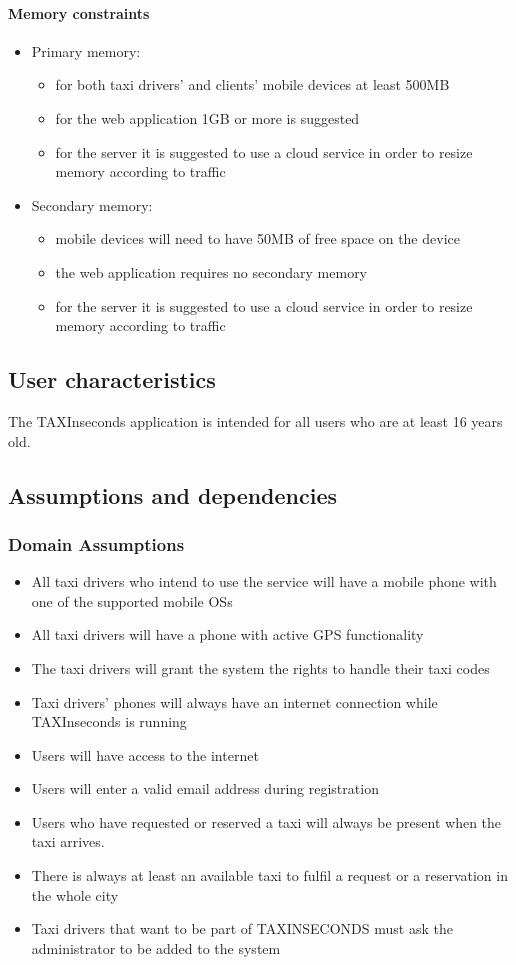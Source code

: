 \documentclass{article}
\begin{document}
\paragraph{Memory constraints} 
\begin{itemize}
	\item Primary memory:
		\begin{itemize}
			\item for both taxi drivers' and clients' mobile devices at least 500MB 
			\item for the web application 1GB or more is suggested
			\item for the server it is suggested to use a cloud service in order to resize memory according to traffic
		\end{itemize}
	\item Secondary memory:
		\begin{itemize}
			\item mobile devices will need to have 50MB of free space on the device
			\item the web application requires no secondary memory 
			\item for the server it is suggested to use a cloud service in order to resize memory according to traffic
		\end{itemize}
\end{itemize}
\subsection{User characteristics}
The TAXInseconds application is intended for all users who are at least 16 years old. 
\subsection{Assumptions and dependencies}
\subsubsection{Domain Assumptions}
\begin{itemize}
	\item All taxi drivers who intend to use the service will have a mobile phone with one of the supported mobile OSs
	\item All taxi drivers will have a phone with active GPS functionality 
	\item The taxi drivers will grant the system the rights to handle their taxi codes
	\item Taxi drivers' phones will always have an internet connection while TAXInseconds is running
	\item Users will have access to the internet
	\item Users will enter a valid email address during registration 
	\item Users who have requested or reserved a taxi will always be present when the taxi arrives.
	\item There is always at least an available taxi to fulfil a request or a reservation in the whole city
	\item Taxi drivers that want to be part of TAXINSECONDS must ask the administrator to be added to the system
\end{itemize}
\clearpage
\end{document}
